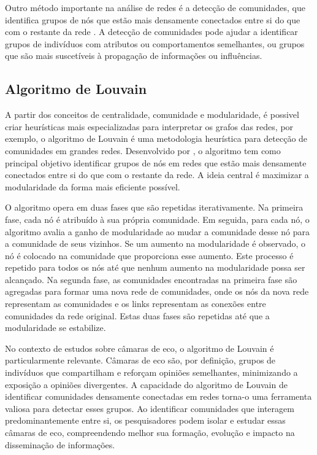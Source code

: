 Outro método importante na análise de redes é a detecção de comunidades, que identifica grupos de nós que estão mais densamente conectados entre si do que com o restante da rede \cite[]{2004_Newman}. A detecção de comunidades pode ajudar a identificar grupos de indivíduos com atributos ou comportamentos semelhantes, ou grupos que são mais suscetíveis à propagação de informações ou influências.

\subsection*{Algoritmo de Louvain}

A partir dos conceitos de centralidade, comunidade e modularidade, é possivel criar heurísticas mais especializadas para interpretar os grafos das redes, por exemplo, o algoritmo de Louvain é uma metodologia heurística para detecção de comunidades em grandes redes. Desenvolvido por , o algoritmo tem como principal objetivo identificar grupos de nós em redes que estão mais densamente conectados entre si do que com o restante da rede. A ideia central é maximizar a modularidade da forma mais eficiente possível.

O algoritmo opera em duas fases que são repetidas iterativamente. Na primeira fase, cada nó é atribuído à sua própria comunidade. Em seguida, para cada nó, o algoritmo avalia a ganho de modularidade ao mudar a comunidade desse nó para a comunidade de seus vizinhos. Se um aumento na modularidade é observado, o nó é colocado na comunidade que proporciona esse aumento. Este processo é repetido para todos os nós até que nenhum aumento na modularidade possa ser alcançado. Na segunda fase, as comunidades encontradas na primeira fase são agregadas para formar uma nova rede de comunidades, onde os nós da nova rede representam as comunidades e os links representam as conexões entre comunidades da rede original. Estas duas fases são repetidas até que a modularidade se estabilize.

No contexto de estudos sobre câmaras de eco, o algoritmo de Louvain é particularmente relevante. Câmaras de eco são, por definição, grupos de indivíduos que compartilham e reforçam opiniões semelhantes, minimizando a exposição a opiniões divergentes. A capacidade do algoritmo de Louvain de identificar comunidades densamente conectadas em redes torna-o uma ferramenta valiosa para detectar esses grupos. Ao identificar comunidades que interagem predominantemente entre si, os pesquisadores podem isolar e estudar essas câmaras de eco, compreendendo melhor sua formação, evolução e impacto na disseminação de informações.

